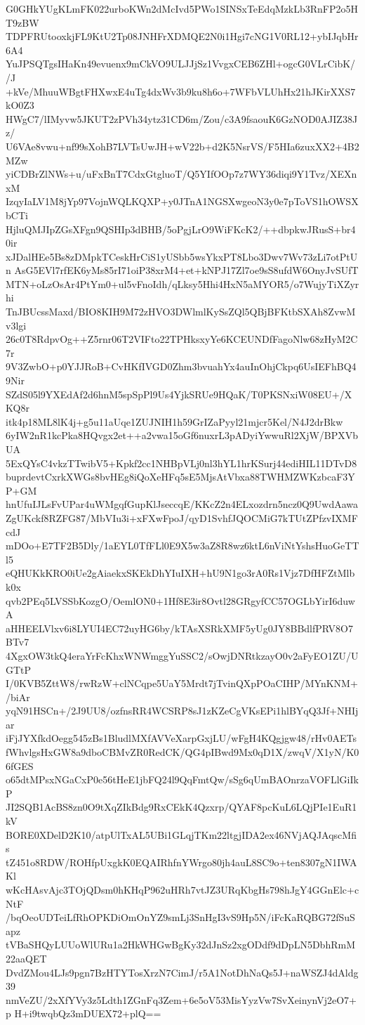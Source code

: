 G0GHkYUgKLmFK022urboKWn2dMcIvd5PWo1SINSxTeEdqMzkLb3RnFP2o5HT9zBW
TDPFRUtooxkjFL9KtU2Tp08JNHFrXDMQE2N0i1Hgi7cNG1V0RL12+ybIJqbHr6A4
YuJPSQTgsIHaKn49evuenx9mCkVO9ULJJjSz1VvgxCEB6ZHl+ogcG0VLrCibK//J
+kVe/MhuuWBgtFHXwxE4uTg4dxWv3b9ku8h6o+7WFbVLUhHx21hJKirXXS7kO0Z3
HWgC7/lIMyvw5JKUT2zPVh34ytz31CD6m/Zou/c3A9fsaouK6GzNOD0AJIZ38Jz/
U6VAe8vwu+nf99sXohB7LVTsUwJH+wV22b+d2K5NsrVS/F5HIa6zuxXX2+4B2MZw
yiCDBrZlNWs+u/uFxBnT7CdxGtgluoT/Q5YIfOOp7z7WY36diqi9Y1Tvz/XEXnxM
IzqyIaLV1M8jYp97VojnWQLKQXP+y0JTnA1NGSXwgeoN3y0e7pToVS1hOWSXbCTi
HjluQMJIpZGsXFgn9QSHIp3dBHB/5oPgjLrO9WiFKcK2/++dbpkwJRusS+br40ir
xJDalHEe5Bs8zDMpkTCeskHrCiS1yUSbb5wsYkxPT8Lbo3Dwv7Wv73zLi7otPtUn
AsG5EVl7rfEK6yMs85rI71oiP38xrM4+et+kNPJ17Zl7oe9sS8ufdW6OnyJvSUfT
MTN+oLzOsAr4PtYm0+ul5vFnoIdh/qLksy5Hhi4HxN5aMYOR5/o7WujyTiXZyrhi
TnJBUcssMaxd/BIO8KIH9M72zHVO3DWlmlKySsZQl5QBjBFKtbSXAh8ZvwMv3lgi
26c0T8RdpvOg++Z5rnr06T2VIFto22TPHksxyYe6KCEUNDfFagoNlw68zHyM2C7r
9V3ZwbO+p0YJJRoB+CvHKfIVGD0Zhm3bvuahYx4auInOhjCkpq6UsIEFhBQ49Nir
SZdS05l9YXEdAf2d6hnM5spSpPl9Us4YjkSRUe9HQaK/T0PKSNxiW08EU+/XKQ8r
itk4p18ML8lK4j+g5u11aUqe1ZUJNIH1h59GrIZaPyyl21mjcr5Kel/N4J2drBkw
6yIW2nR1kcPka8HQvgx2et++a2vwa15oGf6nuxrL3pADyiYwwuRl2XjW/BPXVbUA
5ExQYsC4vkzTTwibV5+Kpkf2cc1NHBpVLj0nl3hYL1hrKSurj44ediHIL11DTvD8
buprdevtCxrkXWGs8bvHEg8iQoXeHFq5sE5MjsAtVbxa88TWHMZWKzbcaF3YP+GM
hnUfuIJLsFvUPar4uWMgqfGupKlJseccqE/KKcZ2n4ELxozdrn5ncz0Q9UwdAawa
ZgUKckf8RZFG87/MbVIu3i+xFXwFpoJ/qyD1SvhfJQOCMiG7kTUtZPfzvIXMFcdJ
mDOo+E7TF2B5Dly/1aEYL0TfFLl0E9X5w3aZ8R8wz6ktL6nViNtYshsHuoGeTTl5
eQHUKkKRO0iUe2gAiaekxSKEkDhYIuIXH+hU9N1go3rA0Rs1Vjz7DfHFZtMlbk0x
qvb2PEq5LVSSbKozgO/OemlON0+1Hf8E3ir8Ovtl28GRgyfCC57OGLbYirI6duwA
aHHEELVlxv6i8LYUI4EC72uyHG6by/kTAsXSRkXMF5yUg0JY8BBdlfPRV8O7BTv7
4XgxOW3tkQ4eraYrFcKhxWNWmggYuSSC2/sOwjDNRtkzayO0v2aFyEO1ZU/UGTtP
I/0KVB5ZttW8/rwRzW+clNCqpe5UaY5Mrdt7jTvinQXpPOaCIHP/MYnKNM+/biAr
yqN91HSCn+/2J9UU8/ozfnsRR4WCSRP8sJ1zKZeCgVKsEPi1hlBYqQ3Jf+NHIjar
iFjJYXfkdOegg545zBs1BludlMXfAVVeXarpGxjLU/wFgH4KQgjgw48/rHv0AETs
fWhvlgsHxGW8a9dboCBMvZR0RedCK/QG4pIBwd9Mx0qD1X/zwqV/X1yN/K06fGES
o65dtMPsxNGaCxP0e56tHeE1jbFQ24l9QqFmtQw/sSg6qUmBAOnrzaVOFLlGiIkP
JI2SQB1AcBS8zn0O9tXqZIkBdg9RxCEkK4Qzxrp/QYAF8pcKuL6LQjPIe1EuR1kV
BORE0XDelD2K10/atpUlTxAL5UBi1GLqjTKm22ltgjIDA2ex46NVjAQJAqscMfis
tZ451o8RDW/ROHfpUxgkK0EQAIRhfnYWrgo80jh4auL8SC9o+ten8307gN1IWAKl
wKcHAsvAjc3TOjQDsm0hKHqP962uHRh7vtJZ3URqKbgHs798hJgY4GGnElc+cNtF
/bqOeoUDTeiLfRhOPKDiOmOnYZ9smLj3SnHgI3vS9Hp5N/iFcKaRQBG72fSuSapz
tVBaSHQyLUUoWlURu1a2HkWHGwBgKy32dJnSz2xgODdf9dDpLN5DbhRmM22aaQET
DvdZMou4LJs9pgn7BzHTYTosXrzN7CimJ/r5A1NotDhNaQs5J+naWSZJ4dAldg39
nmVeZU/2xXfYVy3z5Ldth1ZGnFq3Zem+6e5oV53MisYyzVw7SvXeinynVj2eO7+p
H+i9twqbQz3mDUEX72+plQ==

